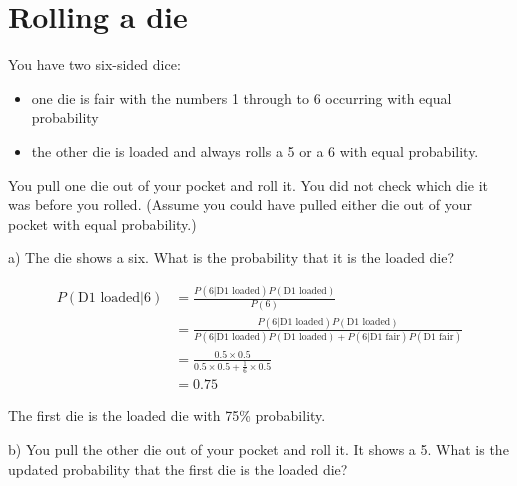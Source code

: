 \documentclass[
  letterpaper,
  DIV=11,
  numbers=noendperiod]{scrreprt}
\begin{document}
\hypertarget{rolling-a-die}{%
\section{Rolling a die}\label{rolling-a-die}}

You have two six-sided dice:

\begin{itemize}
\item
  one die is fair with the numbers 1 through to 6 occurring with equal
  probability
\item
  the other die is loaded and always rolls a 5 or a 6 with equal
  probability.
\end{itemize}

You pull one die out of your pocket and roll it. You did not check which
die it was before you rolled. (Assume you could have pulled either die
out of your pocket with equal probability.)

a) The die shows a six. What is the probability that it is the loaded
die?

\begin{tcolorbox}[enhanced jigsaw, title=\textcolor{quarto-callout-tip-color}{\faLightbulb}\hspace{0.5em}{Answer}, toprule=.15mm, colback=white, breakable, titlerule=0mm, colframe=quarto-callout-tip-color-frame, coltitle=black, opacityback=0, rightrule=.15mm, colbacktitle=quarto-callout-tip-color!10!white, bottomtitle=1mm, opacitybacktitle=0.6, arc=.35mm, bottomrule=.15mm, toptitle=1mm, leftrule=.75mm, left=2mm]

\begin{align*}
P(\text{D1 loaded}|6)&=\frac{P(6|\text{D1 loaded})P(\text{D1 loaded})}{P(6)} \\[6pt]
&=\frac{P(6|\text{D1 loaded})P(\text{D1 loaded})}{P(6|\text{D1 loaded})P(\text{D1 loaded})+P(6|\text{D1 fair})P(\text{D1 fair})} \\[6pt]
&=\frac{0.5\times 0.5}{0.5\times 0.5+\frac{1}{6}\times 0.5} \\[6pt]
&=0.75
\end{align*}

The first die is the loaded die with 75\% probability.

\end{tcolorbox}

b) You pull the other die out of your pocket and roll it. It shows a 5.
What is the updated probability that the first die is the loaded die?
\end{document}
